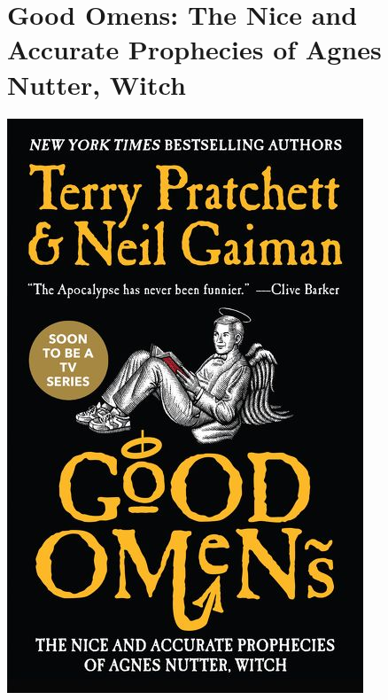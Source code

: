 \documentclass{tufte-handout}
\makeatletter
\newcommand{\varcaption}[2][0pt]{%
  \gsetlength{\@tufte@caption@vertical@offset}{-#1}%
  \gdef\@tufte@stored@varcaption{#2}%
}
\gdef\@tufte@stored@varcaption{} %
\makeatother
\begin{document}
\section*{Good Omens: The Nice and Accurate Prophecies of Agnes Nutter, Witch}
\begin{marginfigure}[9\baselineskip]
   \includegraphics[width=\linewidth]{images/good_omens.jpg}
   \varcaption{\href{https://www.harpercollins.com/9780060853983/good-omens/}{Publisher Link}, \href{https://www.amazon.com/Good-Omens-Accurate-Prophecies-Nutter/dp/0060853980}{Amazon Link}}
\end{marginfigure}
\end{document}
